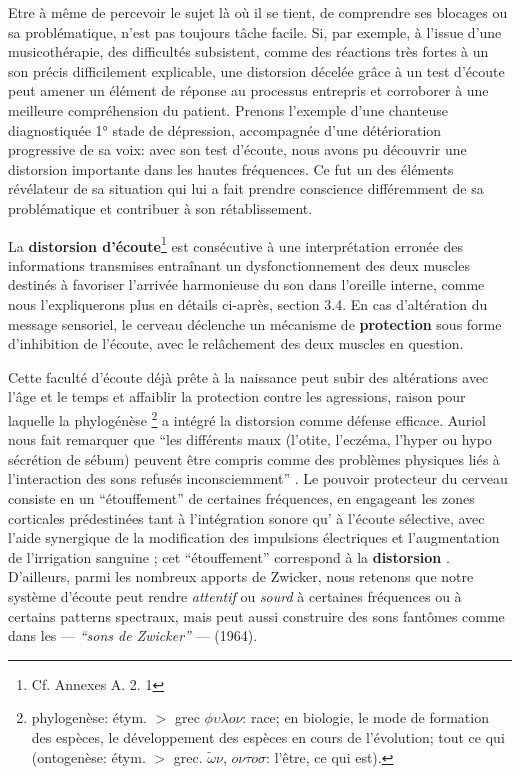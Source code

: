 Etre à même de percevoir le sujet là où il se tient, de comprendre ses blocages ou sa problématique, 
n'est pas toujours tâche facile.
Si, par exemple, à l'issue d'une musicothérapie, des difficultés subsistent, comme des réactions très 
fortes à un son précis difficilement explicable,  une distorsion décelée grâce à un test 
d'écoute peut amener un élément de réponse au processus entrepris et corroborer à une meilleure  
compréhension du patient.   
Prenons  l'exemple d'une chanteuse diagnostiquée 1° stade de dépression, accompagnée d'une 
détérioration progressive de sa voix:  avec son test d'écoute, nous avons pu découvrir une distorsion 
importante dans les hautes fréquences. Ce fut un des éléments révélateur de sa situation qui lui a fait 
prendre conscience différemment  de sa problématique et contribuer à son rétablissement.


 La \textbf{distorsion d'écoute}\footnote {Cf. Annexes A. 2. 1}
 est consécutive à une interprétation
erronée des informations transmises entraînant un dysfonctionnement
des deux muscles destinés à favoriser l'arrivée
harmonieuse du son dans l'oreille interne, comme nous l'expliquerons plus en détails ci-après, section 
3.4.
En cas d'altération du message sensoriel,
le cerveau déclenche un mécanisme de\textbf{ protection} sous forme
d'inhibition de l'écoute, avec le relâchement des deux muscles en
question. 

Cette faculté d'écoute déjà prête à la naissance peut subir des
altérations avec l'âge et
le temps et affaiblir la protection contre les agressions, raison pour
laquelle la phylogénèse \footnote{ phylogenèse: étym. $>$ grec $\phi
  \upsilon \lambda o \nu $: race; en biologie, le mode de formation des espèces, le développement
  des espèces en cours de l'évolution; tout ce qui (ontogenèse:
  étym. $>$ grec. $\tilde{\omega}\nu$, $o \nu \tau o
  \sigma$: l'être,
ce qui est).}  a intégré la distorsion comme défense
efficace.
Auriol nous fait
remarquer que
\enquote {les différents maux (l'otite, l'eczéma, l'hyper
ou hypo sécrétion de sébum) peuvent être compris comme des problèmes physiques liés à l'interaction des sons refusés
inconsciemment} \autocite [19--20]  {auriol:cle}.
Le pouvoir protecteur du cerveau consiste en un  ``étouffement'' de
certaines fréquences,  en engageant les zones corticales prédestinées
tant à
l'intégration sonore qu' à l'écoute sélective,  avec l'aide synergique de la
modification des impulsions électriques et l'augmentation de
l'irrigation sanguine \autocite [14] {auriol:cle};
cet ``étouffement'' correspond à la \textbf{distorsion}
\autocite {tomatis:education}.
D'ailleurs,  parmi les nombreux apports de Zwicker, \autocite[p 84] {auriol:cle} nous retenons que notre 
système d'écoute peut rendre
\textit{attentif} ou\textit{ sourd} à certaines fréquences ou à certains patterns
spectraux, mais peut aussi construire des sons fantômes comme dans les --- \textit{``sons de 
Zwicker''} --- (1964).


